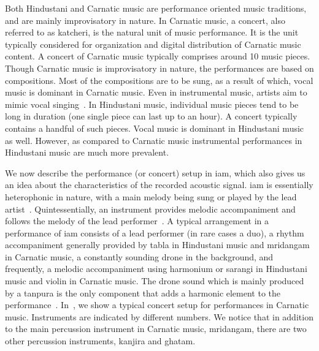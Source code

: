 Both Hindustani and Carnatic music are performance oriented music traditions, and are mainly improvisatory in nature. In Carnatic music, a concert, also referred to as \gls{katcheri}, is the natural unit of music performance. It is the unit typically considered for organization and digital distribution of Carnatic music content. A concert of Carnatic music typically comprises around 10 music pieces. Though Carnatic music is improvisatory in nature, the performances are based on compositions. Most of the compositions are to be sung, as a result of which, vocal music is dominant in Carnatic music. Even in instrumental music, artists aim to mimic vocal singing~\citep{Viswanathan2004}. In Hindustani music, individual music pieces tend to be long in duration (one single piece can last up to an hour). A concert typically contains a handful of such pieces. Vocal music is dominant in Hindustani music as well. However, as compared to Carnatic music instrumental performances in Hindustani music are much more prevalent. 

We now describe the performance (or concert) setup in \gls{iam}, which also gives us an idea about the characteristics of the recorded acoustic signal. \gls{iam} is essentially heterophonic in nature, with a main melody being sung or played by the lead artist~\citep{Bagchee1998}. Quintessentially, an instrument provides melodic accompaniment and follows the melody of the lead performer~\citep{Viswanathan2004}. A typical arrangement in a performance of \gls{iam} consists of a lead performer (in rare cases a duo), a rhythm accompaniment generally provided by \gls{tabla} in Hindustani music and \gls{mridangam} in Carnatic music, a constantly sounding drone in the background, and frequently, a melodic accompaniment using harmonium or \gls{sarangi} in Hindustani music and violin in Carnatic music. The drone sound which is mainly produced by a \gls{tanpura} is the only component that adds a harmonic element to the performance~\citep{Bagchee1998}. In~, we show a typical concert setup for performances in Carnatic music. Instruments are indicated by different numbers. We notice that in addition to the main percussion instrument in Carnatic music, \gls{mridangam}, there are two other percussion instruments, \gls{kanjira} and \gls{ghatam}. 

